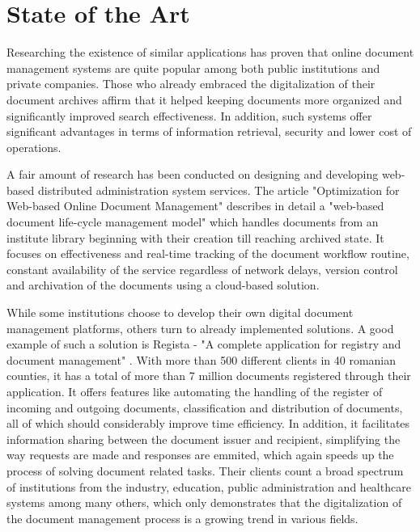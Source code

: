\chapter{State of the Art}
\label{chapter:stateOfTheArt}

Researching the existence of similar applications has proven that online document management systems are quite popular among both public institutions and private companies. Those who already embraced the digitalization of their document archives affirm that it helped keeping documents more organized and significantly improved search effectiveness. In addition, such systems offer significant advantages in terms of information retrieval, security and lower cost of operations.

A fair amount of research has been conducted on designing and developing web-based distributed administration system services. The article "Optimization for Web-based Online Document Management" \cite{Cheng-2013} describes in detail a "web-based document life-cycle management model" which handles documents from an institute library beginning with their creation till reaching archived state. It focuses on effectiveness and real-time tracking of the document workflow routine, constant availability of the service regardless of network delays, version control and archivation of the documents using a cloud-based solution.

While some institutions choose to develop their own digital document management platforms, others turn to already implemented solutions. A good example of such a solution is Regista - "A complete application for registry and document management" \cite{regista}. With more than 500 different clients in 40 romanian counties, it has a total of more than 7 million documents registered through their application. It offers features like automating the handling of the register of incoming and outgoing documents, classification and distribution of documents, all of which should considerably improve time efficiency. In addition, it facilitates information sharing between the document issuer and recipient, simplifying the way requests are made and responses are emmited, which again speeds up the process of solving document related tasks. Their clients count a broad spectrum of institutions from the industry, education, public administration and healthcare systems among many others, which only demonstrates that the digitalization of the document management process is a growing trend in various fields.


